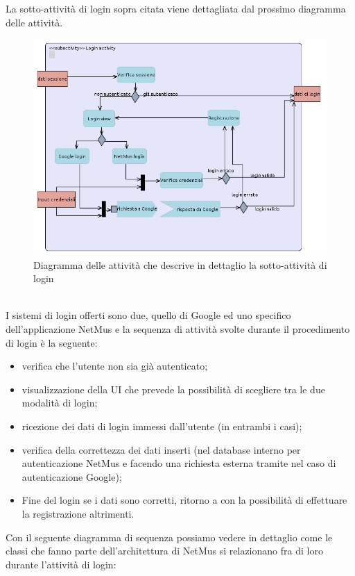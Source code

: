 La sotto-attivit\`a di login sopra citata viene dettagliata dal prossimo diagramma
delle attivit\`a.
\begin{figure}[!h]
  \centering
  \includegraphics[width=15cm]{img/ST/login.png}
\caption{Diagramma delle attivit\`a che descrive in dettaglio la
sotto-attivit\`a di login}
\end{figure}
\\
I sistemi di login offerti sono due, quello di Google ed uno specifico
dell'applicazione NetMus e la sequenza di attivit\`a svolte durante il
procedimento di login \`e la seguente:
\begin{itemize}
  \item verifica che l'utente non sia gi\`a autenticato;
  \item visualizzazione della UI  che prevede la possibilit\`a di
  scegliere tra le due modalit\`a di login;
  \item ricezione dei dati di login immessi dall'utente (in entrambi i casi);
  \item verifica della correttezza dei dati inserti (nel database interno per
  autenticazione NetMus e facendo una richiesta esterna tramite
   nel caso di autenticazione Google);
  \item Fine del login se i dati sono corretti, ritorno a  con la
  possibilit\`a di effettuare la registrazione altrimenti.
\end{itemize}

\vspace{1cm}
Con il seguente diagramma di sequenza possiamo vedere in dettaglio come le
classi che fanno parte dell'architettura di NetMus si relazionano fra di loro
durante l'attivit\`a di login:

